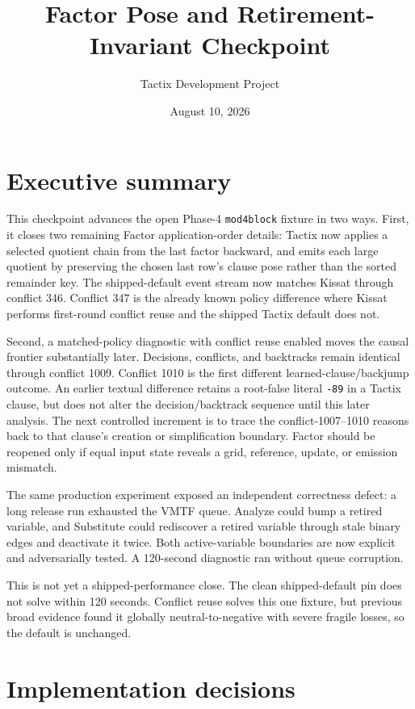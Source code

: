 \documentclass[11pt]{article}
\title{Factor Pose and Retirement-Invariant Checkpoint}
\author{Tactix Development Project}
\date{August 10, 2026}
\newcommand{\code}[1]{\nolinkurl{#1}}
\newcommand{\tactix}{Tactix}
\newcommand{\kissat}{Kissat}
\begin{document}
\maketitle
\sloppy

\section*{Executive summary}

This checkpoint advances the open Phase-4 \code{mod4block} fixture in two
ways.  First, it closes two remaining Factor application-order details:
\tactix{} now applies a selected quotient chain from the last factor backward,
and emits each large quotient by preserving the chosen last row's clause pose
rather than the sorted remainder key.  The shipped-default event stream now
matches \kissat{} through conflict 346.  Conflict 347 is the already known
policy difference where \kissat{} performs first-round conflict reuse and the
shipped \tactix{} default does not.

Second, a matched-policy diagnostic with conflict reuse enabled moves the
causal frontier substantially later.  Decisions, conflicts, and backtracks
remain identical through conflict 1009.  Conflict 1010 is the first different
learned-clause/backjump outcome.  An earlier textual difference retains a
root-false literal \code{-89} in a \tactix{} clause, but does not alter the
decision/backtrack sequence until this later analysis.  The next controlled
increment is to trace the conflict-1007--1010 reasons back to that clause's
creation or simplification boundary.  Factor should be reopened only if equal
input state reveals a grid, reference, update, or emission mismatch.

The same production experiment exposed an independent correctness defect: a
long release run exhausted the VMTF queue.  Analyze could bump a retired
variable, and Substitute could rediscover a retired variable through stale
binary edges and deactivate it twice.  Both active-variable boundaries are
now explicit and adversarially tested.  A 120-second diagnostic ran without
queue corruption.

This is not yet a shipped-performance close.  The clean shipped-default pin
does not solve within 120 seconds.  Conflict reuse solves this one fixture,
but previous broad evidence found it globally neutral-to-negative with severe
fragile losses, so the default is unchanged.

\section{Implementation decisions}
\end{document}

